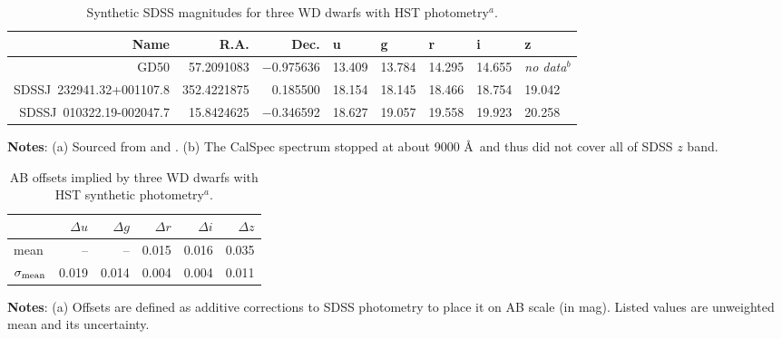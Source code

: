 \documentclass[fleqn,usenatbib]{mnras}
\begin{document}
\begin{table}
	\centering
	\caption{Synthetic SDSS magnitudes for three WD dwarfs with HST photometry$^a$.}
	\label{tab:HST}
	\begin{tabular}{r|r|r|l|l|l|l|l} %
		\hline
		Name & R.A. & Dec. & u & g & r & i & z \\
		\hline
     GD50                     &  57.2091083 &  $-$0.975636 &      13.409 &       13.784 &    14.295 &     14.655 &     {\it no data}$^b$ \\
     SDSSJ~232941.32+001107.8 & 352.4221875 &     0.185500 &      18.154 &       18.145 &    18.466 &     18.754 &     19.042 \\  
     SDSSJ~010322.19-002047.7 &  15.8424625 &  $-$0.346592 &      18.627 &       19.057 &    19.558 &     19.923 &     20.258 \\
		\hline
	\end{tabular}
     \vspace{1ex}

     {\raggedright {\bf Notes}: (a) Sourced from \citet{2014PASP..126..711B} and \citet{2019ApJS..241...20N}. \newline (b) The CalSpec spectrum stopped at about 9000 \AA\ and thus did not cover all of SDSS $z$ band.\par}
\end{table}


\begin{table}
	\centering
	\caption{AB offsets implied by three WD dwarfs with HST synthetic photometry$^a$.}
	\label{tab:AB}
	\begin{tabular}{l|r|r|r|r|r} %
		\hline
		& $\Delta u$ & $\Delta g$ &$\Delta r$ &$\Delta i$ &$\Delta z$ \\
		\hline
  		 {\rm mean}            &    --     &        --     &      0.015    &       0.016    &      0.035     \\ 
  		$\sigma_{\rm mean}$ &         0.019    &        0.014     &      0.004    &       0.004    &      0.011     \\
		\hline
	\end{tabular}
     \vspace{1ex}

     {\raggedright {\bf Notes}: (a) Offsets are defined as additive corrections to SDSS photometry to place it on AB scale (in mag). Listed values are unweighted mean and its uncertainty. \par}
\end{table}


\end{document}

